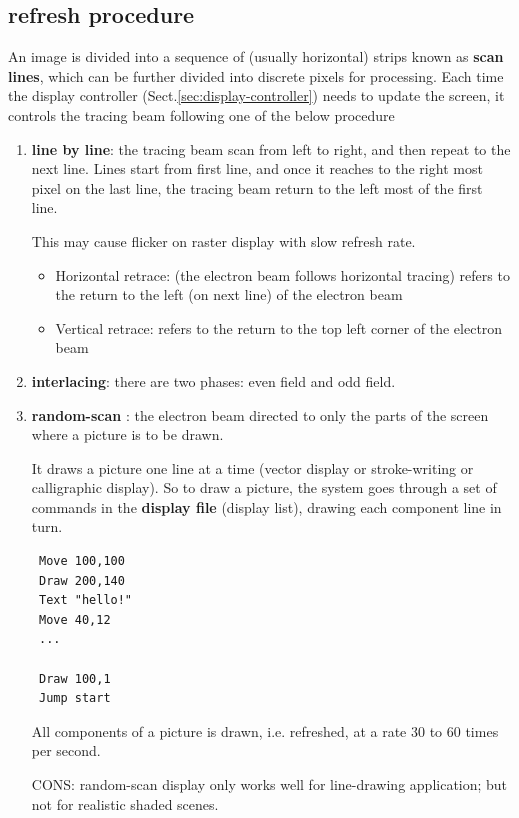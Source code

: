 % 
%   
% 


\subsection{refresh procedure}
\label{sec:refresh-procedure}

An image is divided into a sequence of (usually horizontal) strips known as {\bf
scan lines}, which can be further divided into discrete pixels for processing.
Each time the display controller (Sect.\ref{sec:display-controller}) needs to
update the screen, it controls the tracing beam following one of the below procedure
\begin{enumerate}
  \item  {\bf line by line}: the tracing beam scan from left to right, and then
  repeat to the next line. Lines start from first line, and once it reaches to the
  right most pixel on the last line, the tracing beam return to the left most of
  the first line.
  
This may cause flicker on raster display with slow refresh rate.
\begin{itemize}
  \item Horizontal retrace: (the electron beam follows horizontal tracing)
  refers to the return to the left (on next line) of the electron beam
  
  \item Vertical retrace: refers to the return to the top left corner of the
  electron beam
\end{itemize}

  
  \item {\bf interlacing}: there are two phases: even field and odd field.
   
   \item {\bf random-scan }: the electron beam directed to only the parts of
   the screen where a picture is to be drawn.
   
   It draws a picture one line at a time (vector display or stroke-writing or
   calligraphic display). So to draw a picture, the system goes through a set of
   commands in the {\bf display file} (display list), drawing each component
   line in turn.
 \begin{verbatim}
 Move 100,100
 Draw 200,140
 Text "hello!"
 Move 40,12
 ...
 
 Draw 100,1
 Jump start
 \end{verbatim}
   
   All components of a picture is drawn, i.e. refreshed, at a rate 30 to 60
   times per second.
   
   CONS: random-scan display only works well for line-drawing application; but
   not for realistic shaded scenes.
   
   
\end{enumerate}
